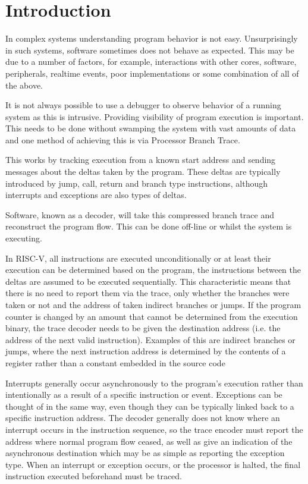 \chapter{Introduction}
\label{sec:intro}

In complex systems understanding program behavior is not easy.
Unsurprisingly in such systems, software sometimes does not behave as
expected. This may be due to a number of factors, for example,
interactions with other cores, software, peripherals, realtime
events, poor implementations or some combination of all of the above.

It is not always possible to use a debugger to observe behavior of a
running system as this is intrusive.  Providing visibility of program
execution is important.  This needs to be done without swamping the
system with vast amounts of data and one method of achieving this is
via Processor Branch Trace.

This works by tracking execution from a known start address and sending
messages about the deltas taken by the program. These deltas are typically
introduced by jump, call, return and branch type instructions,
although interrupts and exceptions are also types of deltas.

Software, known as a decoder, will take this compressed branch trace
and reconstruct the program flow. This can be done off-line or
whilst the system is executing.

In RISC-V, all instructions are executed unconditionally or at least
their execution can be determined based on the program, the
instructions between the deltas are assumed to be executed
sequentially.  This characteristic means that there is no need to
report them via the trace, only whether the branches were taken or not
and the address of taken indirect branches or jumps. If the program
counter is changed by an amount that cannot be determined from the
execution binary, the trace decoder needs to be given the destination
address (i.e. the address of the next valid instruction).  Examples of
this are indirect branches or jumps, where the next instruction
address is determined by the contents of a register rather than a
constant embedded in the source code

Interrupts generally occur asynchronously to the program's execution
rather than intentionally as a result of a specific instruction or
event.  Exceptions can be thought of in the same way, even though they
can be typically linked back to a specific instruction address.  The
decoder generally does not know where an interrupt occurs in the
instruction sequence, so the trace encoder must report the address
where normal program flow ceased, as well as give an indication of the
asynchronous destination which may be as simple as reporting the
exception type.  When an interrupt or exception occurs, or the
processor is halted, the final instruction executed beforehand must be
traced.


